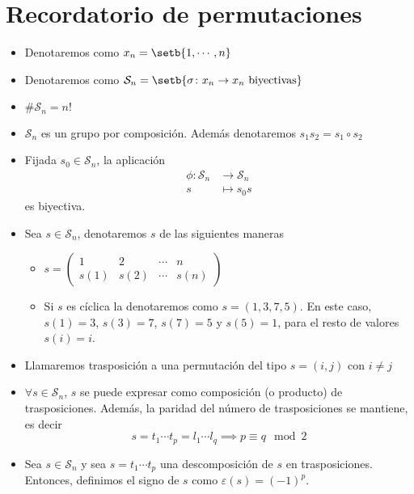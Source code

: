 
\section{Recordatorio de permutaciones}

\begin{itemize}
    \item
        Denotaremos como $ x_n = \setb{1, \cdots, n} $
    \item
        Denotaremos como $ \mathcal{S}_n =\setb{\sigma\colon x_n \to x_n
        \text{ biyectivas}} $
    \item
        $ \#\mathcal{S}_n= n! $
    \item
        $ \mathcal{S}_n $ es un grupo por composición.  Además
        denotaremos $ s_1 s_2 = s_1 \circ s_2 $
    \item
        \label{obs:perm_biy} Fijada $ s_0 \in \mathcal{S}_n $, la
        aplicación
        \[
            \begin{aligned}
                \phi \colon \mathcal{S}_n &\to \mathcal{S}_n \\
                s &\mapsto s_0s
            \end{aligned}
        \]
        es biyectiva.
    \item
        Sea $ s \in \mathcal{S}_n $, denotaremos $ s $ de las siguientes
        maneras
        \begin{itemize}
            \item
                $ s =
                \begin{pmatrix}
                    1 & 2 & \cdots & n \\
                    s(1) & s(2) & \cdots & s(n)
                \end{pmatrix}
                $
            \item
                Si $ s $ es cíclica la denotaremos como $ s = (1,3,7,5)
                $.  En este caso, $ s(1)=3 $, $ s(3)=7 $, $ s(7)=5 $ y $
                s(5)=1 $, para el resto de valores $ s(i)=i $.
        \end{itemize}
    \item
        Llamaremos trasposición a una permutación del tipo $ s=(i,j) $
        con $ i \neq j $
    \item
        $ \forall s \in \mathcal{S}_n $, $ s $ se puede expresar como
        composición (o producto) de trasposiciones.  Además, la
        paridad del número de trasposiciones se mantiene, es decir
        \[
            s = t_1 \cdots t_p = l_1 \cdots l_q \implies p \equiv q \mod
            2
        \]
    \item
        Sea $ s \in \mathcal{S}_n $ y sea $ s=t_1 \cdots t_p $ una
        descomposición de $ s $ en trasposiciones.  Entonces, definimos
        el signo de $ s $ como $ \varepsilon(s) = (-1)^p $.
\end{itemize}

